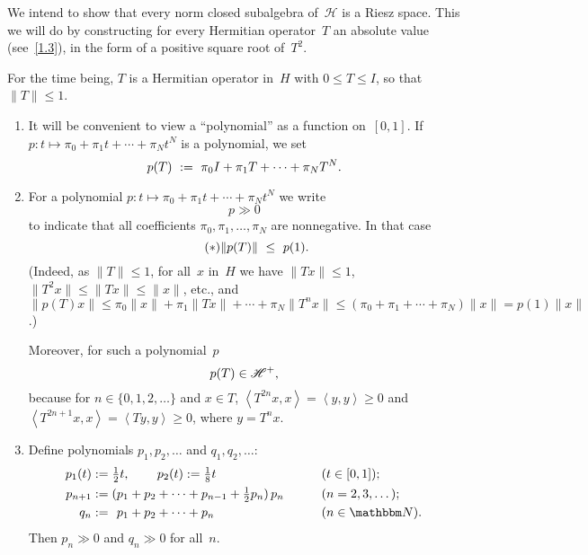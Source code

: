 \documentclass[main.tex]{subfiles}
\begin{document}
\noindent We intend to show that
every norm closed subalgebra of~$\mathscr H$
is a Riesz space.
This we will do by constructing
for every Hermitian operator~$T$
an absolute value (see~\ref{1.3}),
in the form of a positive square root of~$T^2$.
%
%
\begin{psec}{5.18}%
For the time being,
$T$ is a Hermitian operator in~$H$ with $0\leq T\leq I$,
so that $\| T\|\leq 1$.
\begin{enumerate}
\item \label{5.18-1}
It will be convenient to view a ``polynomial'' 
as a function on~$[0,1]$.
If $p\colon t\mapsto \pi_0 + \pi_1 t + \dotsb + \pi_N t^N$
is a polynomial, we set
\begin{equation*}
p(T)\ :=\ \pi_0 I + \pi_1 T + \dotsb + \pi_N T^N\text{.}
\end{equation*}
%
\item \label{5.18-2}
For a polynomial $p\colon t\mapsto \pi_0 + \pi_1 t +\dotsb + \pi_N t^N$
we write
\begin{equation*}
p \gg 0
\end{equation*}
to indicate that all coefficients $\pi_0,\pi_1,\dotsc,\pi_N$
are nonnegative.
In that case
\begin{equation}
\tag{$*$}\label{eq5.18-2}
\|p(T)\| \ \leq \ p(1)\text{.}
\end{equation}
(Indeed,
as $\|T\|\leq 1$, for all~$x$ in~$H$
we have $\|Tx\|\leq 1$,
$\|T^2 x\|\leq \|T x\|\leq \| x\|$,
etc., and $\|p(T)x\|\leq \pi_0 \|x\|+\pi_1 \|Tx\| + \dotsb +\pi_N\|T^n x\|
\leq (\pi_0+\pi_1+\dotsb + \pi_N) \|x \|= p(1)\|x\|$.)

Moreover,
for such a polynomial~$p$
\begin{equation*}
p(T)\in\mathscr{H}^+\text{,}
\end{equation*}
because for $n\in\{0,1,2,\dotsc\}$
and $x\in T$,
$\left< T^{2n}x,x\right>=\left<y,y\right>\geq 0$
and $\left< T^{2n+1} x,x\right>=\left< Ty,y\right>\geq 0$,
where $y=T^n x$.
%
\item \label{1.18-3}
Define polynomials $p_1,p_2,\dotsc$ and $q_1,q_2,\dotsc$:
\begin{alignat*}{2}
 p_1(t)&:={\textstyle\frac{1}{2} t\htam{, }\qquad
 p_2(t):=\frac{1}{8}} t\qquad &&(t\in[0,1])\htam{;}\\
p_{n+1}&:=(p_1+p_2+\dotsb+p_{n-1}+{\textstyle\frac{1}{2}}p_n)\, p_n
\qquad&&(n=2,3,\dotsc)\htam{;}\\
    q_n&:=\phantom{(}p_1+p_2+\dotsb+p_n\qquad&&(n\in \N)\htam{.}
\end{alignat*}
Then $p_n\gg 0$ and $q_n\gg 0$ for all~$n$.


\end{enumerate}
\end{psec}
\end{document}
